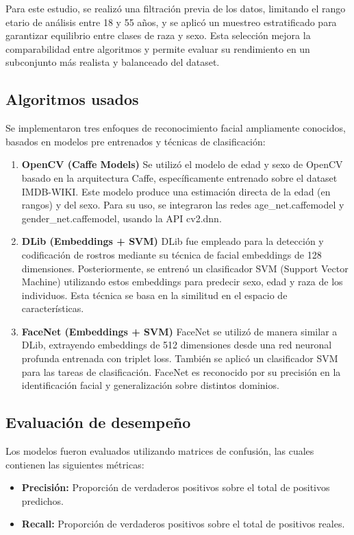 Para este estudio, se realizó una filtración previa de los datos, limitando el rango etario de análisis entre 18 y 55 años, y se aplicó un muestreo estratificado para garantizar equilibrio entre clases de raza y sexo. Esta selección mejora la comparabilidad entre algoritmos y permite evaluar su rendimiento en un subconjunto más realista y balanceado del dataset.

\subsection{Algoritmos usados}
Se implementaron tres enfoques de reconocimiento facial ampliamente conocidos, basados en modelos pre entrenados y técnicas de clasificación:

\begin{enumerate}
  \item \textbf{OpenCV (Caffe Models)}
        Se utilizó el modelo de edad y sexo de OpenCV basado en la arquitectura Caffe, específicamente entrenado sobre el dataset IMDB-WIKI. Este modelo produce una estimación directa de la edad (en rangos) y del sexo. Para su uso, se integraron las redes age\_net.caffemodel y gender\_net.caffemodel, usando la API cv2.dnn.
  \item \textbf{DLib (Embeddings + SVM)}
        DLib fue empleado para la detección y codificación de rostros mediante su técnica de facial
        embeddings de 128 dimensiones. Posteriormente, se entrenó un clasificador SVM (Support Vector Machine) utilizando estos embeddings para predecir sexo, edad y raza de los individuos. Esta técnica se basa en la similitud en el espacio de características.
  \item \textbf{FaceNet (Embeddings + SVM)}
        FaceNet se utilizó de manera similar a DLib, extrayendo embeddings de 512 dimensiones desde una red neuronal profunda entrenada con triplet loss. También se aplicó un clasificador SVM para las tareas de clasificación. FaceNet es reconocido por su precisión en la identificación facial y generalización sobre distintos dominios.
\end{enumerate}

\subsection{Evaluación de desempeño}
Los modelos fueron evaluados utilizando matrices de confusión, las cuales contienen las siguientes métricas:

\begin{itemize}
  \item \textbf{Precisión:} Proporción de verdaderos positivos sobre el total de positivos predichos.
  \item \textbf{Recall:} Proporción de verdaderos positivos sobre el total de positivos reales.
\end{itemize}


